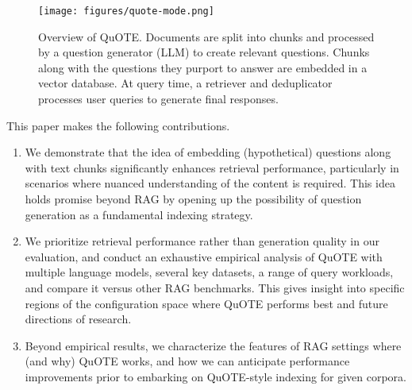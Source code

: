 \begin{figure}[ht]
    \centering
    \texttt{[image: figures/quote-mode.png]}
    \caption{Overview of QuOTE. Documents are split into chunks and processed by a question generator (LLM) to create relevant questions. Chunks along with the questions they purport to answer are embedded in a vector database. At query time, a retriever and deduplicator processes user queries to generate final responses.}
    \label{fig:quote_overview}
\end{figure}


This paper makes the following contributions.
\begin{enumerate}
\item We demonstrate that 
the idea of embedding (hypothetical) questions along with text chunks significantly enhances retrieval performance, particularly in scenarios where nuanced understanding of the content is required. This idea holds promise beyond RAG by opening up the possibility of question generation as a fundamental indexing strategy.
\item 
We prioritize retrieval performance 
rather than
generation quality in our evaluation, and
conduct an exhaustive empirical analysis of QuOTE with multiple language models, several key datasets, a range of query workloads, and compare it versus other RAG benchmarks. This gives insight into specific regions of the configuration space where QuOTE performs best and future directions of research.
\item Beyond empirical results, we characterize the features of RAG settings 
where (and why) QuOTE works, and how we can anticipate performance improvements prior to embarking on QuOTE-style indexing for given corpora. 
\end{enumerate}
